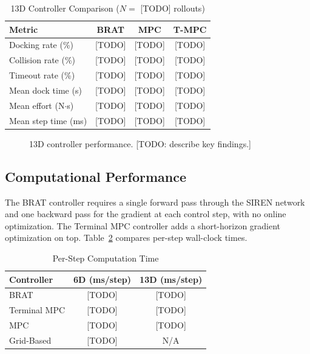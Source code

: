 \documentclass[letterpaper, 10 pt, conference]{ieeeconf}
\begin{document}
\begin{table}[t]
\caption{13D Controller Comparison ($N = $ [TODO] rollouts)}
\label{tab:13d_results}
\centering
\begin{tabular}{lccc}
\toprule
Metric & BRAT & MPC & T-MPC \\
\midrule
Docking rate (\%) & [TODO] & [TODO] & [TODO] \\
Collision rate (\%) & [TODO] & [TODO] & [TODO] \\
Timeout rate (\%) & [TODO] & [TODO] & [TODO] \\
Mean dock time (s) & [TODO] & [TODO] & [TODO] \\
Mean effort (N$\cdot$s) & [TODO] & [TODO] & [TODO] \\
Mean step time (ms) & [TODO] & [TODO] & [TODO] \\
\bottomrule
\end{tabular}
\end{table}

   \begin{figure}[t]
      \centering
      \caption{13D controller performance. [TODO: describe key findings.]}
      \label{fig:13d_results}
   \end{figure}

\subsection{Computational Performance}

The BRAT controller requires a single forward pass through the SIREN network and one backward pass for the gradient at each control step, with no online optimization. The Terminal MPC controller adds a short-horizon gradient optimization on top. Table~\ref{tab:timing} compares per-step wall-clock times.

\begin{table}[t]
\caption{Per-Step Computation Time}
\label{tab:timing}
\centering
\begin{tabular}{lcc}
\toprule
Controller & 6D (ms/step) & 13D (ms/step) \\
\midrule
BRAT & [TODO] & [TODO] \\
Terminal MPC & [TODO] & [TODO] \\
MPC & [TODO] & [TODO] \\
Grid-Based & [TODO] & N/A \\
\bottomrule
\end{tabular}
\end{table}
\end{document}
